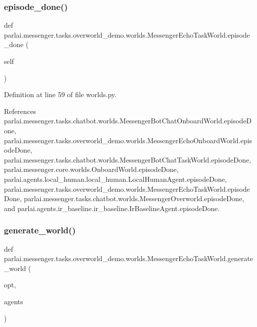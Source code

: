 \subsubsection{\texorpdfstring{episode\+\_\+done()}{episode\_done()}}
{\footnotesize\ttfamily def parlai.\+messenger.\+tasks.\+overworld\+\_\+demo.\+worlds.\+Messenger\+Echo\+Task\+World.\+episode\+\_\+done (\begin{DoxyParamCaption}\item[{}]{self }\end{DoxyParamCaption})}



Definition at line 59 of file worlds.\+py.



References parlai.\+messenger.\+tasks.\+chatbot.\+worlds.\+Messenger\+Bot\+Chat\+Onboard\+World.\+episode\+Done, parlai.\+messenger.\+tasks.\+overworld\+\_\+demo.\+worlds.\+Messenger\+Echo\+Onboard\+World.\+episode\+Done, parlai.\+messenger.\+tasks.\+chatbot.\+worlds.\+Messenger\+Bot\+Chat\+Task\+World.\+episode\+Done, parlai.\+messenger.\+core.\+worlds.\+Onboard\+World.\+episode\+Done, parlai.\+agents.\+local\+\_\+human.\+local\+\_\+human.\+Local\+Human\+Agent.\+episode\+Done, parlai.\+messenger.\+tasks.\+overworld\+\_\+demo.\+worlds.\+Messenger\+Echo\+Task\+World.\+episode\+Done, parlai.\+messenger.\+tasks.\+chatbot.\+worlds.\+Messenger\+Overworld.\+episode\+Done, and parlai.\+agents.\+ir\+\_\+baseline.\+ir\+\_\+baseline.\+Ir\+Baseline\+Agent.\+episode\+Done.

\mbox{\label{classparlai_1_1messenger_1_1tasks_1_1overworld__demo_1_1worlds_1_1MessengerEchoTaskWorld_a2a2c83540c92e2068837c966f57d28e6}} 
\subsubsection{\texorpdfstring{generate\+\_\+world()}{generate\_world()}}
{\footnotesize\ttfamily def parlai.\+messenger.\+tasks.\+overworld\+\_\+demo.\+worlds.\+Messenger\+Echo\+Task\+World.\+generate\+\_\+world (\begin{DoxyParamCaption}\item[{}]{opt,  }\item[{}]{agents }\end{DoxyParamCaption})\hspace{0.3cm}{\ttfamily [static]}}



